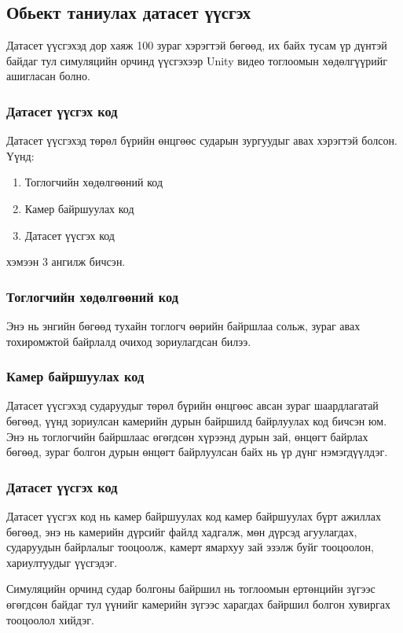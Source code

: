 \newpage
\subsection{Обьект таниулах датасет үүсгэх}

Датасет үүсгэхэд дор хаяж 100 зураг хэрэгтэй бөгөөд, их байх тусам үр дүнтэй байдаг тул симуляцийн орчинд үүсгэхээр Unity видео тоглоомын хөдөлгүүрийг ашигласан болно.

\subsubsection{Датасет үүсгэх код}

Датасет үүсгэхэд төрөл бүрийн өнцгөөс сударын зургуудыг авах хэрэгтэй болсон. Үүнд:
\begin{enumerate}
    \item Тоглогчийн хөдөлгөөний код
    \item Камер байршуулах код
    \item Датасет үүсгэх код
\end{enumerate}
хэмээн 3 ангилж бичсэн.

\subsubsection{Тоглогчийн хөдөлгөөний код}

Энэ нь энгийн бөгөөд тухайн тоглогч өөрийн байршлаа сольж, зураг авах тохиромжтой байрлалд очиход зориулагдсан билээ.

\subsubsection{Камер байршуулах код}

Датасет үүсгэхэд сударуудыг төрөл бүрийн өнцгөөс авсан зураг шаардлагатай бөгөөд, үүнд зориулсан камерийн дурын байршилд байрлуулах код бичсэн юм.
Энэ нь тоглогчийн байршлаас өгөгдсөн хүрээнд дурын зай, өнцөгт байрлах бөгөөд, зураг болгон дурын өнцөгт байрлуулсан байх нь үр дүнг нэмэгдүүлдэг.

\subsubsection{Датасет үүсгэх код}

Датасет үүсгэх код нь камер байршуулах код камер байршуулах бүрт ажиллах бөгөөд, энэ нь камерийн дүрсийг файлд хадгалж, мөн дүрсэд агуулагдах, сударуудын байрлалыг тооцоолж, камерт ямархуу зай эзэлж буйг тооцоолон, хариултуудыг үүсгэдэг.

Симуляцийн орчинд судар болгоны байршил нь тоглоомын ертөнцийн зүгээс өгөгдсөн байдаг тул үүнийг камерийн зүгээс харагдах байршил болгон хувиргах тооцоолол хийдэг.

